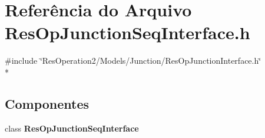 \section{Referência do Arquivo Res\+Op\+Junction\+Seq\+Interface.\+h}
\label{_res_op_junction_seq_interface_8h}
{\ttfamily \#include \char`\"{}Res\+Operation2/\+Models/\+Junction/\+Res\+Op\+Junction\+Interface.\+h\char`\"{}}\\*
\subsection*{Componentes}
\begin{DoxyCompactItemize}
\item 
class {\bf Res\+Op\+Junction\+Seq\+Interface}
\end{DoxyCompactItemize}

